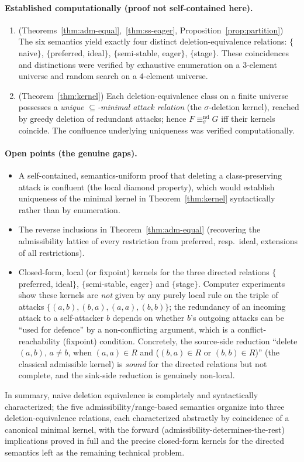 \documentclass{amsart}
\theoremstyle{remark}
\begin{document}
\paragraph{Established computationally (proof not self-contained here).}
\begin{enumerate}
\item[(4)] (Theorems~\ref{thm:adm-equal},~\ref{thm:ss-eager},
Proposition~\ref{prop:partition}) The six semantics yield exactly four distinct
deletion-equivalence relations: $\{$naive$\}$, $\{$preferred, ideal$\}$,
$\{$semi-stable, eager$\}$, $\{$stage$\}$.  These coincidences and distinctions
were verified by exhaustive enumeration on a $3$-element universe and random
search on a $4$-element universe.
\item[(5)] (Theorem~\ref{thm:kernel}) Each deletion-equivalence class on a
finite universe possesses a \emph{unique $\subseteq$-minimal attack relation}
(the $\sigma$-deletion kernel), reached by greedy deletion of redundant attacks;
hence $F\equiv^{\mathrm{nd}}_\sigma G$ iff their kernels coincide.  The
confluence underlying uniqueness was verified computationally.
\end{enumerate}

\paragraph{Open points (the genuine gaps).}
\begin{itemize}
\item A self-contained, semantics-uniform proof that deleting a class-preserving
attack is confluent (the local diamond property), which would establish
uniqueness of the minimal kernel in Theorem~\ref{thm:kernel} syntactically
rather than by enumeration.
\item The reverse inclusions in Theorem~\ref{thm:adm-equal} (recovering the
admissibility lattice of every restriction from preferred, resp.\ ideal,
extensions of all restrictions).
\item Closed-form, local (or fixpoint) kernels for the three directed relations
$\{$preferred, ideal$\}$, $\{$semi-stable, eager$\}$ and $\{$stage$\}$.  Computer
experiments show these kernels are \emph{not} given by any purely local rule on
the triple of attacks $\{(a,b),(b,a),(a,a),(b,b)\}$; the redundancy of an
incoming attack to a self-attacker $b$ depends on whether $b$'s outgoing attacks
can be ``used for defence'' by a non-conflicting argument, which is a
conflict-reachability (fixpoint) condition.  Concretely, the source-side
reduction ``delete $(a,b)$, $a\neq b$, when $(a,a)\in R$ and ($(b,a)\in R$ or
$(b,b)\in R$)'' (the classical admissible kernel) is \emph{sound} for the
directed relations but not complete, and the sink-side reduction is genuinely
non-local.
\end{itemize}

In summary, naive deletion equivalence is completely and syntactically
characterized; the five admissibility/range-based semantics organize into three
deletion-equivalence relations, each characterized abstractly by coincidence of a
canonical minimal kernel, with the forward (admissibility-determines-the-rest)
implications proved in full and the precise closed-form kernels for the directed
semantics left as the remaining technical problem.
\end{document}

